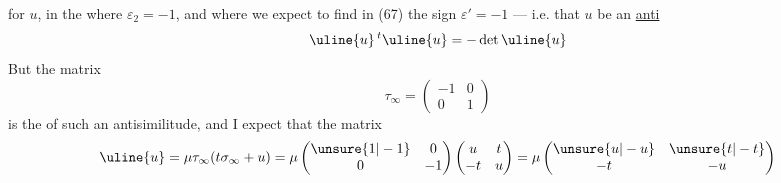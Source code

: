 for $u$, in the  where $\varepsilon_2=-1$, and where we expect
to find in (67) the sign $\varepsilon'=-1$ --- i.e. that
$u$ be an \uline{anti}
\[
\uline{u}\,{}^t\uline{u}=-\det\uline{u}
\]
But  the matrix
\[
\tau_\infty=\begin{pmatrix}-1&0\\0&1\end{pmatrix}
\]
is the  of such an antisimilitude, and I
expect that the matrix
\[
\uline{u}=\mu\tau_\infty(t\sigma_\infty+u)
=\mu\begin{pmatrix}\unsure{1|-1}&0\\0&-1\end{pmatrix}
\begin{pmatrix}u&t\\-t&u\end{pmatrix}
=\mu\begin{pmatrix}\unsure{u|-u}&\unsure{t|-t}\\-t&-u\end{pmatrix}
\]


